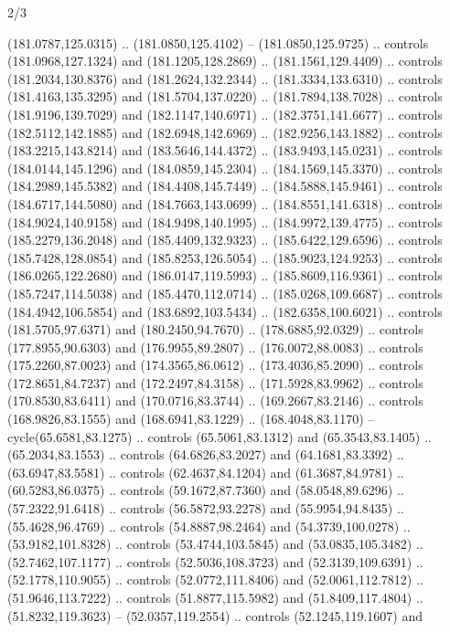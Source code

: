 \begin{flagdescription}{2/3}
\begin{scope}[shift={(0.5\flaglength,0.5)},scale=\flagwidth/320]
\begin{scope}[y=0.8pt, x=0.8pt, yscale=-1,shift={(-118.3,-146)}]
  (181.0787,125.0315) .. (181.0850,125.4102) -- (181.0850,125.9725) .. controls
  (181.0968,127.1324) and (181.1205,128.2869) .. (181.1561,129.4409) .. controls
  (181.2034,130.8376) and (181.2624,132.2344) .. (181.3334,133.6310) .. controls
  (181.4163,135.3295) and (181.5704,137.0220) .. (181.7894,138.7028) .. controls
  (181.9196,139.7029) and (182.1147,140.6971) .. (182.3751,141.6677) .. controls
  (182.5112,142.1885) and (182.6948,142.6969) .. (182.9256,143.1882) .. controls
  (183.2215,143.8214) and (183.5646,144.4372) .. (183.9493,145.0231) .. controls
  (184.0144,145.1296) and (184.0859,145.2304) .. (184.1569,145.3370) .. controls
  (184.2989,145.5382) and (184.4408,145.7449) .. (184.5888,145.9461) .. controls
  (184.6717,144.5080) and (184.7663,143.0699) .. (184.8551,141.6318) .. controls
  (184.9024,140.9158) and (184.9498,140.1995) .. (184.9972,139.4775) .. controls
  (185.2279,136.2048) and (185.4409,132.9323) .. (185.6422,129.6596) .. controls
  (185.7428,128.0854) and (185.8253,126.5054) .. (185.9023,124.9253) .. controls
  (186.0265,122.2680) and (186.0147,119.5993) .. (185.8609,116.9361) .. controls
  (185.7247,114.5038) and (185.4470,112.0714) .. (185.0268,109.6687) .. controls
  (184.4942,106.5854) and (183.6892,103.5434) .. (182.6358,100.6021) .. controls
  (181.5705,97.6371) and (180.2450,94.7670) .. (178.6885,92.0329) .. controls
  (177.8955,90.6303) and (176.9955,89.2807) .. (176.0072,88.0083) .. controls
  (175.2260,87.0023) and (174.3565,86.0612) .. (173.4036,85.2090) .. controls
  (172.8651,84.7237) and (172.2497,84.3158) .. (171.5928,83.9962) .. controls
  (170.8530,83.6411) and (170.0716,83.3744) .. (169.2667,83.2146) .. controls
  (168.9826,83.1555) and (168.6941,83.1229) .. (168.4048,83.1170) --
  cycle(65.6581,83.1275) .. controls (65.5061,83.1312) and (65.3543,83.1405) ..
  (65.2034,83.1553) .. controls (64.6826,83.2027) and (64.1681,83.3392) ..
  (63.6947,83.5581) .. controls (62.4637,84.1204) and (61.3687,84.9781) ..
  (60.5283,86.0375) .. controls (59.1672,87.7360) and (58.0548,89.6296) ..
  (57.2322,91.6418) .. controls (56.5872,93.2278) and (55.9954,94.8435) ..
  (55.4628,96.4769) .. controls (54.8887,98.2464) and (54.3739,100.0278) ..
  (53.9182,101.8328) .. controls (53.4744,103.5845) and (53.0835,105.3482) ..
  (52.7462,107.1177) .. controls (52.5036,108.3723) and (52.3139,109.6391) ..
  (52.1778,110.9055) .. controls (52.0772,111.8406) and (52.0061,112.7812) ..
  (51.9646,113.7222) .. controls (51.8877,115.5982) and (51.8409,117.4804) ..
  (51.8232,119.3623) -- (52.0357,119.2554) .. controls (52.1245,119.1607) and

\end{scope}
\end{scope}
\end{flagdescription}
